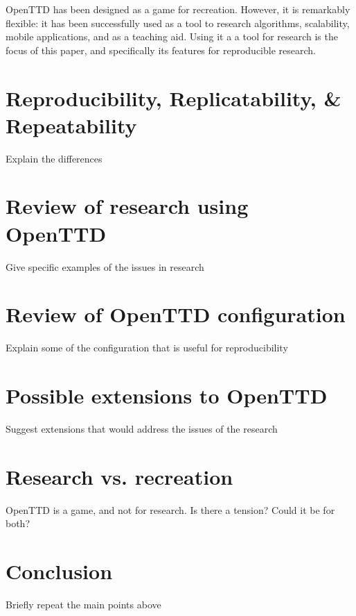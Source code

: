 \documentclass[twocolumn]{article}
\begin{document}
OpenTTD has been designed as a game for recreation. However, it is remarkably flexible: it has been successfully used as a tool to research algorithms, scalability, mobile applications, and as a teaching aid. Using it a a tool for research is the focus of this paper, and specifically its features for reproducible research.

\section{Reproducibility, Replicatability, \& Repeatability}
\begin{YStkyNote}[TODO]
Explain the differences
\end{YStkyNote}

\section{Review of research using OpenTTD}

\begin{YStkyNote}[TODO]
Give specific examples of the issues in research
\end{YStkyNote}

\section{Review of OpenTTD configuration}

\begin{YStkyNote}[TODO]
Explain some of the configuration that is useful for reproducibility
\end{YStkyNote}

\section{Possible extensions to OpenTTD}

\begin{YStkyNote}[TODO]
Suggest extensions that would address the issues of the research
\end{YStkyNote}

\section{Research vs. recreation}

\begin{YStkyNote}[TODO]
OpenTTD is a game, and not for research. Is there a tension? Could it be for both?
\end{YStkyNote}

\section{Conclusion}

\begin{YStkyNote}[TODO]
Briefly repeat the main points above
\end{YStkyNote}

\normalsize


\end{document}
